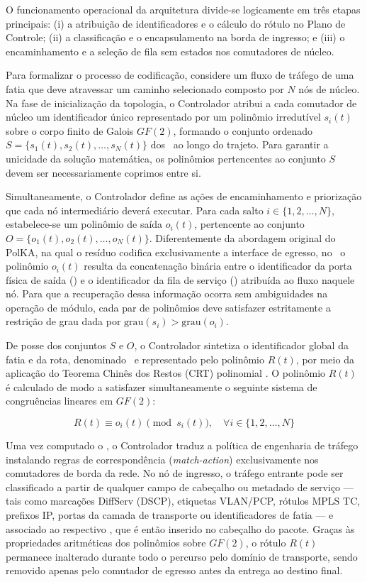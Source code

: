 O funcionamento operacional da arquitetura divide-se logicamente em três etapas principais: (i) a atribuição de identificadores e o cálculo do rótulo no Plano de Controle; (ii) a classificação e o encapsulamento na borda de ingresso; e (iii) o encaminhamento e a seleção de fila sem estados nos comutadores de núcleo.

Para formalizar o processo de codificação, considere um fluxo de tráfego de uma fatia que deve atravessar um caminho selecionado composto por $N$ nós de núcleo. Na fase de inicialização da topologia, o Controlador atribui a cada comutador de núcleo um identificador único representado por um polinômio irredutível $s_i(t)$ sobre o corpo finito de Galois $GF(2)$, formando o conjunto ordenado $S = \{s_1(t), s_2(t), \ldots, s_N(t)\}$ dos \nodeIDs\ ao longo do trajeto. Para garantir a unicidade da solução matemática, os polinômios pertencentes ao conjunto $S$ devem ser necessariamente coprimos entre si.

Simultaneamente, o Controlador define as ações de encaminhamento e priorização que cada nó intermediário deverá executar. Para cada salto $i \in \{1, 2, \ldots, N\}$, estabelece-se um polinômio de saída $o_i(t)$, pertencente ao conjunto $O = \{o_1(t), o_2(t), \ldots, o_N(t)\}$. Diferentemente da abordagem original do PolKA, na qual o resíduo codifica exclusivamente a interface de egresso, no \nome\ o polinômio $o_i(t)$ resulta da concatenação binária entre o identificador da porta física de saída (\portID) e o identificador da fila de serviço (\qID) atribuída ao fluxo naquele nó. Para que a recuperação dessa informação ocorra sem ambiguidades na operação de módulo, cada par de polinômios deve satisfazer estritamente a restrição de grau dada por $\text{grau}(s_i) > \text{grau}(o_i)$.

De posse dos conjuntos $S$ e $O$, o Controlador sintetiza o identificador global da fatia e da rota, denominado \routeID\ e representado pelo polinômio $R(t)$, por meio da aplicação do Teorema Chinês dos Restos (CRT) polinomial \cite{Shoup:2009, dominicini2020}. O polinômio $R(t)$ é calculado de modo a satisfazer simultaneamente o seguinte sistema de congruências lineares em $GF(2)$:

\begin{equation}
\label{eq:crt_spolka}
R(t) \equiv o_i(t) \pmod{s_i(t)}, \quad \forall i \in \{1, 2, \ldots, N\}
\end{equation}

Uma vez computado o \routeID, o Controlador traduz a política de engenharia de tráfego instalando regras de correspondência (\textit{match-action}) exclusivamente nos comutadores de borda da rede. No nó de ingresso, o tráfego entrante pode ser classificado a partir de qualquer campo de cabeçalho ou metadado de serviço --- tais como marcações DiffServ (DSCP), etiquetas VLAN/PCP, rótulos MPLS TC, prefixos IP, portas da camada de transporte ou identificadores de fatia --- e associado ao respectivo \routeID, que é então inserido no cabeçalho do pacote. Graças às propriedades aritméticas dos polinômios sobre $GF(2)$, o rótulo $R(t)$ permanece inalterado durante todo o percurso pelo domínio de transporte, sendo removido apenas pelo comutador de egresso antes da entrega ao destino final.


